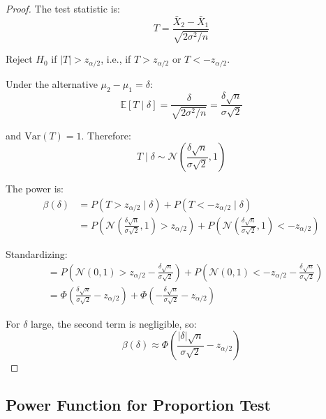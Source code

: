 \begin{proof}
The test statistic is:
\begin{equation}
T = \frac{\bar{X}_2 - \bar{X}_1}{\sqrt{2\sigma^2/n}}
\end{equation}

Reject $H_0$ if $|T| > z_{\alpha/2}$, i.e., if $T > z_{\alpha/2}$ or $T < -z_{\alpha/2}$.

Under the alternative $\mu_2 - \mu_1 = \delta$:
\begin{equation}
\mathbb{E}[T \mid \delta] = \frac{\delta}{\sqrt{2\sigma^2/n}} = \frac{\delta\sqrt{n}}{\sigma\sqrt{2}}
\end{equation}

and $\text{Var}(T) = 1$. Therefore:
\begin{equation}
T \mid \delta \sim \mathcal{N}\left(\frac{\delta\sqrt{n}}{\sigma\sqrt{2}}, 1\right)
\end{equation}

The power is:
\begin{align}
\beta(\delta) &= P(T > z_{\alpha/2} \mid \delta) + P(T < -z_{\alpha/2} \mid \delta) \\
&= P\left(\mathcal{N}\left(\frac{\delta\sqrt{n}}{\sigma\sqrt{2}}, 1\right) > z_{\alpha/2}\right) + P\left(\mathcal{N}\left(\frac{\delta\sqrt{n}}{\sigma\sqrt{2}}, 1\right) < -z_{\alpha/2}\right)
\end{align}

Standardizing:
\begin{align}
&= P\left(\mathcal{N}(0,1) > z_{\alpha/2} - \frac{\delta\sqrt{n}}{\sigma\sqrt{2}}\right) + P\left(\mathcal{N}(0,1) < -z_{\alpha/2} - \frac{\delta\sqrt{n}}{\sigma\sqrt{2}}\right) \\
&= \Phi\left(\frac{\delta\sqrt{n}}{\sigma\sqrt{2}} - z_{\alpha/2}\right) + \Phi\left(-\frac{\delta\sqrt{n}}{\sigma\sqrt{2}} - z_{\alpha/2}\right)
\end{align}

For $\delta$ large, the second term is negligible, so:
\begin{equation}
\beta(\delta) \approx \Phi\left(\frac{|\delta|\sqrt{n}}{\sigma\sqrt{2}} - z_{\alpha/2}\right)
\end{equation}
\end{proof}

\subsection{Power Function for Proportion Test}

